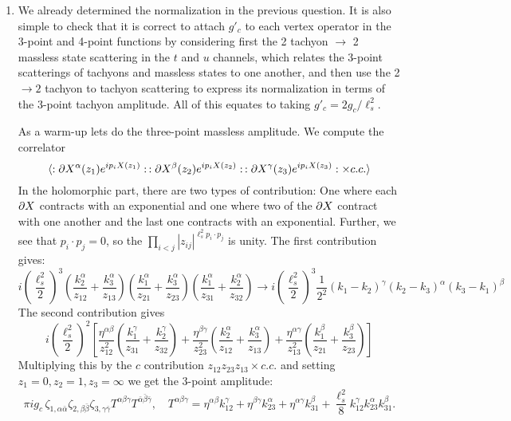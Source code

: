 \documentclass[11pt, class=article, crop=false]{standalone}
\begin{document}
\begin{enumerate}
	\item 
	We already determined the normalization in the previous question. It is also simple to check that it is correct to attach $g'_c$ to each vertex operator in the 3-point and 4-point functions by considering first the 2 tachyon $\to$ 2 massless state scattering in the $t$ and $u$ channels, which relates the $3$-point scatterings of tachyons and massless states to one another, and then use the 2 $\to 2$ tachyon to tachyon scattering to express its normalization in terms of the 3-point tachyon amplitude. All of this equates to taking $g'_c = 2 g_c/\ell_s^2$. 
	
	As a warm-up lets do the three-point massless amplitude. We compute the correlator
	\[
		\braket{:\partial X^\alpha(z_1) e^{i p_i X(z_1)}: \, :\partial X^\beta(z_2) e^{i p_i X(z_2)}: \, :\partial X^\gamma(z_3) e^{i p_i X(z_3)}: \times c.c.}
	\]
	In the holomorphic part, there are two types of contribution: One where each $\partial X$ contracts with an exponential and one where two of the $\partial X$ contract with one another and the last one contracts with an exponential. Further, we see that $p_i \cdot p_j = 0$, so the $\prod_{i<j} |z_{ij}|^{\ell_s^2 p_i \cdot p_j}$ is unity. The first contribution gives:
	\[
		i \left(\frac{\ell_s^2}{2}\right)^3 
		\left(\frac{k_2^\alpha}{z_{12}} + \frac{k_3^\alpha}{z_{13}}\right) 
		\left(\frac{k_1^\alpha}{z_{21}} + \frac{k_3^\alpha}{z_{23}}\right)
		\left(\frac{k_1^\alpha}{z_{31}} + \frac{k_2^\alpha}{z_{32}}\right)
		\to i  \left(\frac{\ell_s^2}{2}\right)^3 \frac{1}{2^2}  (k_1-k_2)^\gamma (k_2 - k_3)^\alpha (k_3 - k_1)^\beta
	\]
	The second contribution gives
	\[
		i \left(\frac{\ell_s^2}{2}\right)^2 
		\left[ \frac{\eta^{\alpha \beta}}{z_{12}^2} \left(\frac{k_1^\gamma}{z_{31}} + \frac{k_2^\gamma}{z_{32}} \right)
		+ \frac{\eta^{\beta \gamma}}{z_{23}^2} \left(\frac{k_2^\alpha}{z_{12}} + \frac{k_3^\alpha}{z_{13}} \right)
		+ \frac{\eta^{\alpha \gamma}}{z_{13}^2} \left(\frac{k_1^\beta}{z_{21}} + \frac{k_3^\beta}{z_{23}} \right) \right]
	\]
	Multiplying this by the $c$ contribution $z_{12} z_{23} z_{13} \times c.c.$ and setting $z_1 = 0, z_2 = 1, z_3 = \infty$ we get the 3-point amplitude:
	\begin{equation}\label{eq:3ptmassless}
		\pi i g_c \, \zeta_{1, \alpha \bar \alpha} \zeta_{2, \beta \bar \beta} \zeta_{3, \gamma \bar \gamma} T^{\alpha \beta \gamma} T^{\bar \alpha \bar \beta \bar \gamma}, \quad T^{\alpha \beta \gamma} = \eta^{\alpha \beta} k_{12}^\gamma + \eta^{\beta \gamma} k_{23}^\alpha + \eta^{\alpha \gamma} k_{31}^\beta + \frac{\ell_s^2}{8} k_{12}^\gamma k_{23}^\alpha k_{31}^\beta.
	\end{equation}
	

\end{enumerate}
\end{document}
